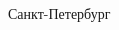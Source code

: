 \begin{spacing}{1}
\begin{table}[H]
\begin{tabular}{p{1.3in}p{1.0in}p{-0.04in}p{1.63in}p{-0.04in}p{1.63in}}
\end{tabular}
\end{table}

\vspace*{\fill}

\begin{center}
Санкт-Петербург \the\year{}
\end{center}\par

\newpage

\setlength{\parindent}{1.25cm} %

\end{spacing} %
